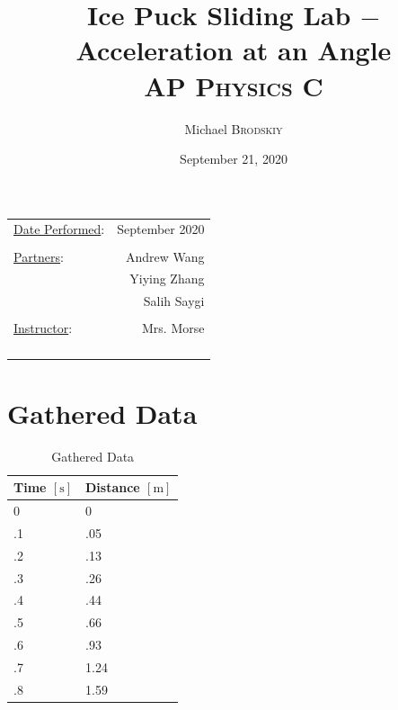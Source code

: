 \documentclass{article}
\title{Ice Puck Sliding Lab $-$ Acceleration at an Angle\\ AP \textsc{Physics} C}
\author{Michael \textsc{Brodskiy}}
\date{September 21, 2020}
\begin{document}
\maketitle
\begin{center}
\begin{tabular}{l r}
\underline{Date Performed}: & September 2020 \\\\ %
\underline{Partners}: & Andrew Wang \\ & Yiying Zhang \\ & Salih Saygi \\\\
\underline{Instructor}: & Mrs. Morse \\\\\\\\\\ %
\end{tabular}
\end{center}
\newpage

\tableofcontents
\listoftables
\listoffigures

\newpage
    
\section{Gathered Data}
\begin{center}
  
\begin{table}[H]\label{tab:Gathered Data} 
  \centering
\begin{tabular}{|l|l|}

  \hline
  Time $[\si{\second}]$ & Distance $[\si{\meter}]$ \\
  \hline
   0 & 0  \\
  \hline
  \rowcolor{Gray}
  .1 & .05  \\
  \hline
  .2 & .13 \\
  \hline
  \rowcolor{Gray}
  .3 & .26 \\
  \hline
  .4 & .44 \\
  \hline
  \rowcolor{Gray}
  .5 & .66 \\
  \hline
  .6 & .93 \\
  \hline
  \rowcolor{Gray}
  .7 & 1.24\\
  \hline
  .8 & 1.59\\
  \hline
\end{tabular}
\caption{Gathered Data}
\end{table}

\end{center}
\end{document}
